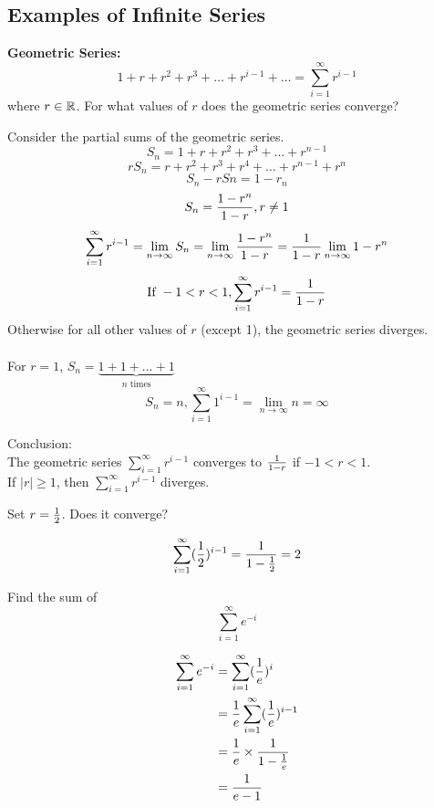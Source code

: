 \documentclass[english, 12pt]{article}
\begin{document}
\subsection{Examples of Infinite Series}
\begin{defn}
\textbf{Geometric Series:}
\[1+r+r^2+r^3+ \dots + r^{i-1}+\dots = \sum_{i=1}^\infty r^{i-1}\]
where $r \in {\mathbb{R}}$. For what values of $r$ does the geometric series converge?
\begin{sol}
Consider the partial sums of the geometric series.
\[S_{n} = 1 + r + r^2 + r^3 + \dots + r^{n-1} \]
\[rS_{n} = r + r^2 + r^3 + r^4 + \dots + r^{n-1} + r^{n}\]
\[S_{n} - rS{n} = 1 - r_{n} \]
\[S_{n} = \frac{1-r^n}{1-r}, r \neq 1 \]
\[\sum_{i=1}^\infty r^{i-1} = \lim_{n\to\infty} S_{n} = \lim_{n\to\infty} \frac{1-r^n}{1-r} = \frac{1}{1-r} \lim_{n\to\infty} 1-r^n \]
\[\text{If } -1  < r < 1, \sum_{i=1}^\infty r^{i-1} = \frac{1}{1-r}\]
Otherwise for all other values of $r$ (except 1), the geometric series diverges.\\\\
For $r=1$, $S_{n} = \underbrace{1 + 1 + \dots + 1}_{n \text{ times}}$
\[S_{n} = n, \sum_{i=1}^\infty 1^{i-1} = \lim_{n\to\infty} n = \infty \]
\end{sol}
\end{defn}
\begin{mthd}
Conclusion:\\
The geometric series $\sum_{i=1}^\infty r^{i-1}$ converges to $\frac{1}{1-r}$ if $-1 < r < 1$.\\ 
If $|r| \geq 1$, then $\sum_{i=1}^\infty r^{i-1}$ diverges.
\end{mthd}
\begin{exmp}
Set $r=\frac{1}{2}$. Does it converge?
\begin{sol}
\[\sum_{i=1}^\infty (\frac{1}{2})^{i-1} = \frac{1}{1-\frac{1}{2}} = 2 \]
\end{sol}
\end{exmp}
\begin{exmp}\label{exp:4.2}
Find the sum of
\[\sum_{i=1}^\infty e^{-i}\]
\begin{sol}
\begin{align*}
\sum_{i=1}^\infty e^{-i} &= \sum_{i=1}^\infty (\frac{1}{e})^{i}\\
&= \frac{1}{e} \sum_{i=1}^\infty (\frac{1}{e})^{i-1}\\
&= \frac{1}{e} \times \frac{1}{1-\frac{1}{e}}\\
&= \frac{1}{e-1}
\end{align*}
\end{sol}
\end{exmp}
\end{document}
